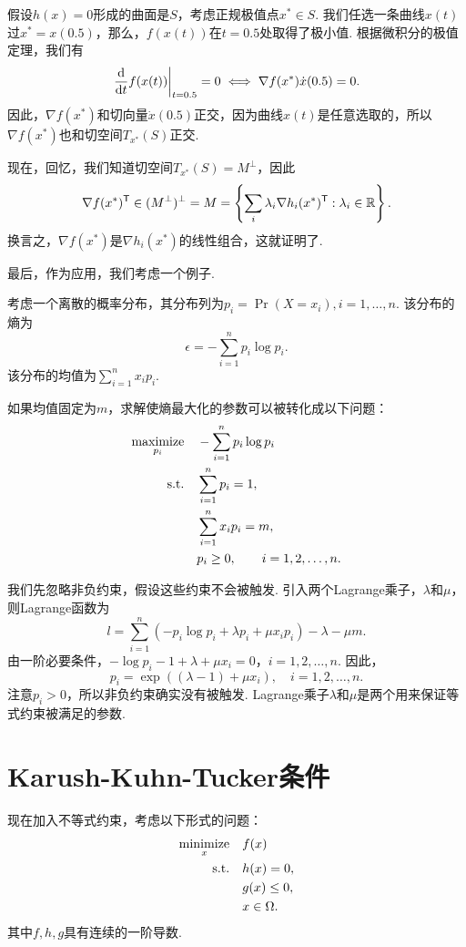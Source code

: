 假设$h(x)=0$形成的曲面是$S$，考虑正规极值点$x^*\in S$. 我们任选一条曲线$x(t)$过$x^*=x(0.5)$，那么，$f(x(t))$在$t=0.5$处取得了极小值. 根据微积分的极值定理，我们有
\[\left.\frac{\mathrm{d}}{\mathrm{d} t}f(x(t))\right|_{t=0.5}=0\iff \nabla f(x^*)\dot{x}(0.5)=0.\]
因此，$\nabla f(x^*)$和切向量$\dot{x}(0.5)$正交，因为曲线$x(t)$是任意选取的，所以$\nabla f(x^*)$也和切空间$T_{x^*}(S)$正交.

现在，回忆，我们知道切空间$T_{x^*}(S)=M^\perp$，因此
\[\nabla f(x^*)^{\mathsf{T}}\in (M^\perp)^\perp=M=\left\{\sum_{i} \lambda_i \nabla h_i(x^*)^{\mathsf{T}}:\lambda_i\in\mathbb{R}\right\}.\]
换言之，$\nabla f(x^*)$是$\nabla h_i(x^*)$的线性组合，这就证明了.


最后，作为应用，我们考虑一个例子.

\begin{example}[最大熵]\label{ex:max-entropy}
考虑一个离散的概率分布，其分布列为$p_i=\Pr(X=x_i),i=1,\dots,n$. 该分布的熵为
\[\epsilon = -\sum_{i=1}^n p_i \log p_i.\]
该分布的均值为$\sum_{i=1}^n x_i p_i$. 

如果均值固定为$m$，求解使熵最大化的参数可以被转化成以下问题：
\begin{align*}
\operatorname*{maximize}_{p_i}\quad&-\sum_{i=1}^n p_i\log p_i \\
\text{s.t.}\quad& \sum_{i=1}^n p_i=1, \\
&\sum_{i=1}^n x_i p_i=m, \\
&p_i\geq 0, \qquad i=1,2,\dots,n.
\end{align*}

我们先忽略非负约束，假设这些约束不会被触发. 引入两个Lagrange乘子，$\lambda$和$\mu$，则Lagrange函数为
\[l=\sum_{i=1}^n (-p_i\log p_i+\lambda p_i+\mu x_ip_i)-\lambda-\mu m.\]
由一阶必要条件，$-\log p_i -1+\lambda+\mu x_i=0$，$i=1,2,\dots,n$. 因此，
\[p_i=\exp((\lambda-1)+\mu x_i),\quad i=1,2,\dots, n.\]
注意$p_i>0$，所以非负约束确实没有被触发. Lagrange乘子$\lambda$和$\mu$是两个用来保证等式约束被满足的参数. 
\end{example}

\section{Karush-Kuhn-Tucker条件}\label{sec:KKT}
现在加入不等式约束，考虑以下形式的问题：
\begin{equation}
\begin{aligned}
\operatorname*{minimize}_x\quad& f(x) \\
\text{s.t.}\quad& h(x)=0, \\
&g(x)\leq 0,\\
& x \in \Omega.
\end{aligned}\label{eq:ineq-constraint-inequality-differentiable}
\end{equation}
其中$f,h,g$具有连续的一阶导数. 

